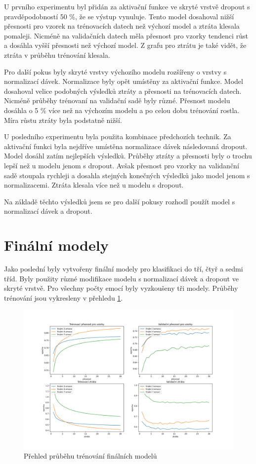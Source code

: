 \documentclass[FM,BP]{tulthesis}
\begin{document}
U prvního experimentu byl přidán za aktivační funkce ve skryté vrstvě dropout s pravděpodobností 50 \%, že se výstup vynuluje. Tento model dosahoval nižší přesnosti pro vzorek na trénovacích datech než výchozí model a ztráta klesala pomaleji. Nicméně na validačních datech měla přesnost pro vzorky tendenci růst a dosáhla vyšší přesnosti než výchozí model. Z grafu pro ztrátu je také vidět, že ztráta v průběhu trénování klesala. 

Pro další pokus byly skryté vrstvy výchozího modelu rozšířeny o vrstvy s normalizací dávek. Normalizace byly opět umístěny za aktivační funkce. Model dosahoval velice podobných výsledků ztráty a přesnosti na trénovacích datech. Nicméně průběhy trénovaní na validační sadě byly různé. Přesnost modelu dosáhla o 5 \% více než na výchozím modelu a po celou dobu trénování rostla. Míra růstu ztráty byla podstatně nižší. 

U posledního experimentu byla použita kombinace předchozích technik. Za aktivační funkci byla nejdříve umístěna normalizace dávek následovaná dropout. Model dosáhl zatím nejlepších výsledků. Průběhy ztráty a přesnosti byly o trochu lepší než u modelu jenom s dropout. Avšak přesnost pro vzorky na validanční sadě stoupala rychleji a dosahla stejných konečných výsledků jako model jenom s normalizacemi. Ztráta klesala více než u modelu s dropout.

Na základě těchto výsledků jsem se pro další pokusy rozhodl použít model s normalizací dávek a dropout.

\clearpage
\section{Finální modely}
Jako poslední byly vytvořeny finální modely pro klasifikaci do tří, čtyř a sedmi tříd. Byly použity různé modifikace modelu s normalizací dávek a dropout ve skryté vrstvě. Pro všechny počty emocí byly vyzkoušeny tři modely. Průběhy trénování jsou vykresleny v přehledu \ref{fig:final_training_course}.

\begin{figure}[!htbp]
\centerline{\includegraphics[scale=.5]{training_course-final.png}}
\caption{Přehled průběhu trénování finálních modelů}
\label{fig:final_training_course}
\end{figure}
\FloatBarrier
\end{document}
